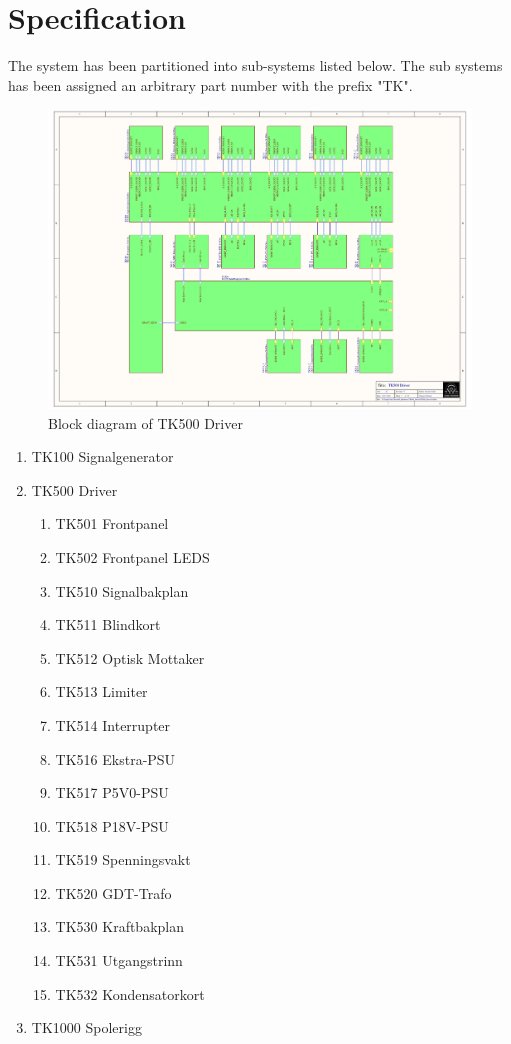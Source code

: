 \section{Specification}
The system has been partitioned into sub-systems listed below. The sub systems has been assigned an arbitrary part number with the prefix "TK".

\begin{figure}
    \centering
    \includegraphics[trim={5cm 2cm 5cm 1cm},clip,width=\textwidth]{img/TK500_Driver.pdf}
    \caption{Block diagram of TK500 Driver}
    \label{fig:tk500}
\end{figure}

\begin{enumerate}
    \item TK100 Signalgenerator
    \item TK500 Driver
    \begin{enumerate}
        \item TK501 Frontpanel
        \item TK502 Frontpanel LEDS
        \item TK510 Signalbakplan
        \item TK511 Blindkort
        \item TK512 Optisk Mottaker
        \item TK513 Limiter
        \item TK514 Interrupter
        \item TK516 Ekstra-PSU
        \item TK517 P5V0-PSU
        \item TK518 P18V-PSU
        \item TK519 Spenningsvakt
        \item TK520 GDT-Trafo
        \item TK530 Kraftbakplan
        \item TK531 Utgangstrinn
        \item TK532 Kondensatorkort
    \end{enumerate}
    \item TK1000 Spolerigg
\end{enumerate}

